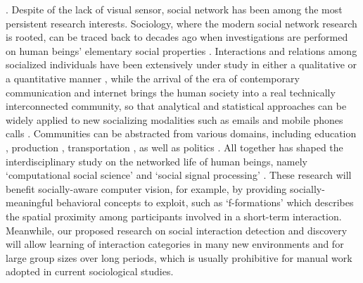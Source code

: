 .  Despite of the lack of visual sensor, social network has been among the most persistent research interests. Sociology, where the modern social network research is rooted, can be traced back to decades ago when investigations are performed on human beings' elementary social properties \cite{Darwin,Thomkins,Goffman,Kendon1990,Ekman,Hoyle,Tannen}. Interactions and relations among socialized individuals have been extensively under study in either a qualitative or a quantitative manner \cite{Goodwin2000,Goldin,Goodwin2007,Kendon2010}, while the arrival of the era of contemporary communication and internet brings the human society into a real technically interconnected community, so that analytical and statistical approaches can be widely applied to new socializing modalities such as emails \cite{Eckmann} and mobile phones calls \cite{Onnela,Eagle}. Communities can be abstracted from various domains, including education \cite{Scherr2009}, production \cite{Watts}, transportation \cite{Gonzalez},  as well as politics \cite{Iacus}. All together has shaped the interdisciplinary study on the networked life of human beings, namely `computational social science' \cite{Lazer2009} and `social signal processing' \cite{Pantic}. These research will benefit socially-aware computer vision, for example, by providing socially-meaningful behavioral concepts to exploit, such as `f-formations' \cite{Kendon1990} which describes the spatial proximity among participants involved in a short-term interaction. Meanwhile, our proposed research on social interaction detection and discovery will allow learning of interaction categories in many new environments and for large group sizes over long periods, which is usually prohibitive for manual work adopted in current sociological studies.



